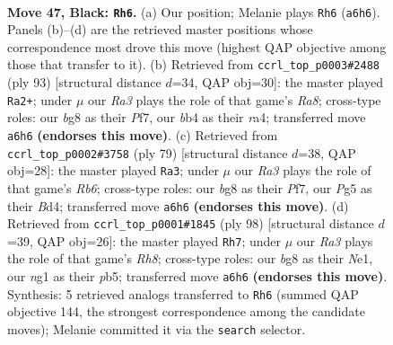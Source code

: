 \documentclass[11pt]{article}
\begin{document}
\clearpage

\begin{figure}[p]\centering
\begin{subfigure}{0.46\textwidth}\centering
\resizebox{\linewidth}{!}{%
\newchessgame
\chessboard[
  setfen={3k2B1/8/r7/6p1/1B3pb1/PP6/1K5P/R5N1 b - - 0 47},
  showmover=false,
  pgfstyle=straightmove, color=movearrow, markmove={a6-h6}
]}
\caption{}
\end{subfigure}\hfill
\begin{subfigure}{0.46\textwidth}\centering
\resizebox{\linewidth}{!}{%
\newchessgame
\chessboard[
  setfen={8/5pk1/7p/8/R3P1b1/P2P2P1/5KB1/r7 b - - 0 47},
  showmover=false,
  pgfstyle=straightmove, color=movearrow, markmove={a1-a2}
]}
\caption{}
\end{subfigure}
\\[4pt]
\begin{subfigure}{0.46\textwidth}\centering
\resizebox{\linewidth}{!}{%
\newchessgame
\chessboard[
  setfen={6R1/5p2/B2k3p/P7/3b3P/1r4PK/8/8 b - - 0 40},
  showmover=false,
  pgfstyle=straightmove, color=movearrow, markmove={b3-a3}
]}
\caption{}
\end{subfigure}\hfill
\begin{subfigure}{0.46\textwidth}\centering
\resizebox{\linewidth}{!}{%
\newchessgame
\chessboard[
  setfen={7R/8/6p1/1pkBp2p/4P1b1/7r/5K2/4N3 w - - 0 50},
  showmover=false,
  pgfstyle=straightmove, color=movearrow, markmove={h8-h7}
]}
\caption{}
\end{subfigure}
\caption{\textbf{Move 47, Black: \texttt{Rh6}.} (a) Our position; Melanie plays \texttt{Rh6} (\texttt{a6h6}). Panels (b)--(d) are the retrieved master positions whose correspondence most drove this move (highest QAP objective among those that transfer to it). (b) Retrieved from \texttt{ccrl\_top\_p0003\#2488} (ply 93) [structural distance $d$=34, QAP obj=30]: the master played \texttt{Ra2+}; under $\mu$ our \emph{Ra3} plays the role of that game's \emph{Ra8}; cross-type roles: our \emph{b}g8 as their \emph{P}f7, our \emph{b}b4 as their \emph{r}a4; transferred move \texttt{a6h6} \textbf{(endorses this move)}. (c) Retrieved from \texttt{ccrl\_top\_p0002\#3758} (ply 79) [structural distance $d$=38, QAP obj=28]: the master played \texttt{Ra3}; under $\mu$ our \emph{Ra3} plays the role of that game's \emph{Rb6}; cross-type roles: our \emph{b}g8 as their \emph{P}f7, our \emph{P}g5 as their \emph{B}d4; transferred move \texttt{a6h6} \textbf{(endorses this move)}. (d) Retrieved from \texttt{ccrl\_top\_p0001\#1845} (ply 98) [structural distance $d$=39, QAP obj=26]: the master played \texttt{Rh7}; under $\mu$ our \emph{Ra3} plays the role of that game's \emph{Rh8}; cross-type roles: our \emph{b}g8 as their \emph{N}e1, our \emph{n}g1 as their \emph{p}b5; transferred move \texttt{a6h6} \textbf{(endorses this move)}. Synthesis: 5 retrieved analogs transferred to \texttt{Rh6} (summed QAP objective 144, the strongest correspondence among the candidate moves); Melanie committed it via the \texttt{search} selector.}
\label{fig:thought-m93}
\end{figure}
\end{document}
